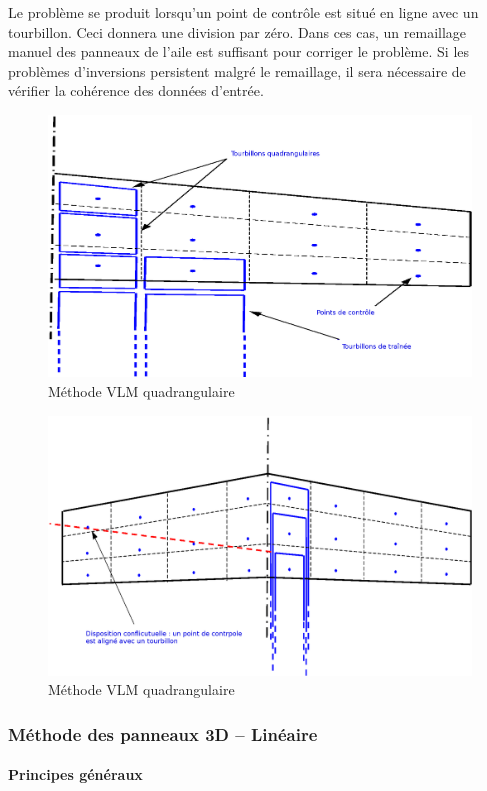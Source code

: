 \documentclass[a4paper,twoside,12pt,dvips]{article}
\begin{document}
Le problème se produit lorsqu’un point de contrôle est situé en ligne avec un tourbillon. Ceci donnera une division par zéro. Dans ces cas, un remaillage manuel des panneaux de l’aile est suffisant pour corriger le problème. Si les problèmes d’inversions persistent malgré le remaillage, il sera nécessaire de vérifier la cohérence des données d’entrée.

\begin{figure}[htbp]
	\centering
	\includegraphics[width=0.7\linewidth]{img-19-fr}
	\caption{Méthode VLM quadrangulaire}
	\label{img:VLM_quad_1}
\end{figure}

\begin{figure}[htbp]
	\centering
	\includegraphics[width=0.7\linewidth]{img-20-fr}
	\caption{Méthode VLM quadrangulaire}
	\label{img:VLM_quad_2}
\end{figure}

\clearpage

\subsubsection{Méthode des panneaux 3D – Linéaire}

\paragraph{Principes généraux}
\end{document}
